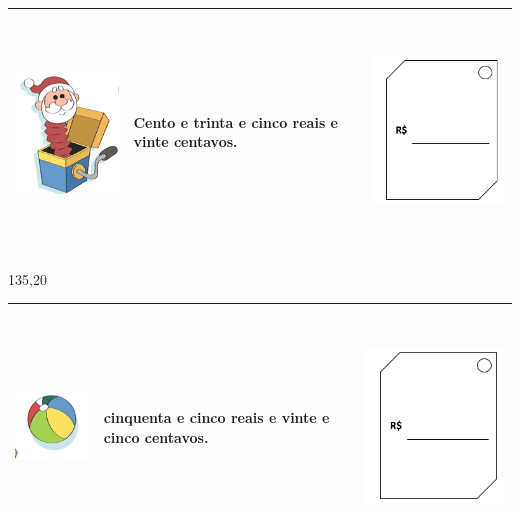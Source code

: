 \begin{longtable}[]{@{}lll@{}}
\toprule
\includegraphics[width=1.70857in,height=2.10446in]{media/image55.png} &
Cento e trinta e cinco reais e vinte centavos. &
\includegraphics[width=2.19822in,height=2.44826in]{media/image56.png}\tabularnewline
\bottomrule
\end{longtable}

135,20

\begin{longtable}[]{@{}lll@{}}
\toprule
\includegraphics[width=1.16683in,height=1.08348in]{media/image57.png} &
cinquenta e cinco reais e vinte e cinco centavos. &
\includegraphics[width=2.19822in,height=2.44826in]{media/image56.png}\tabularnewline
\bottomrule
\end{longtable}

